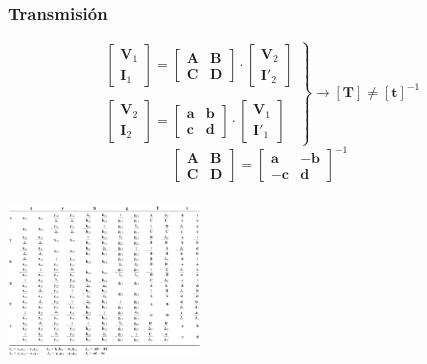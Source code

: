 \subsubsection{Transmisión}
\label{sec:org47212d8}
\[
  \left.
    \begin{array}{l}
  \left[
    \begin{array}{c}
      \mathbf{V}_1\\
      \mathbf{I}_1
    \end{array}
  \right] =
  \left[
    \begin{array}{cc}
      \mathbf{A} & \mathbf{B}\\
      \mathbf{C} & \mathbf{D}
    \end{array}
  \right] \cdot
  \left[
    \begin{array}{c}
      \mathbf{V}_2\\
      \mathbf{I'}_2
    \end{array}
  \right]
      \\ \\
  \left[
    \begin{array}{c}
      \mathbf{V}_2\\
      \mathbf{I}_2
    \end{array}
  \right] =
  \left[
    \begin{array}{cc}
      \mathbf{a} & \mathbf{b}\\
      \mathbf{c} & \mathbf{d}
    \end{array}
  \right] \cdot
  \left[
    \begin{array}{c}
      \mathbf{V}_1\\
      \mathbf{I'}_1
    \end{array}
  \right]
      \end{array}
    \right\}
    \rightarrow
    \boxed{[\mathbf{T}] \neq [\mathbf{t}]^{-1}}
  \]
\[
  \boxed{
    \left[
      \begin{array}{cc}
        \mathbf{A} & \mathbf{B}\\
        \mathbf{C} & \mathbf{D}
      \end{array}\right] = 
      \left[
      \begin{array}{cc}
        \mathbf{a} & \mathbf{-b}\\
        \mathbf{-c} & \mathbf{d}
      \end{array}
      \right]^{-1}
    }
\]
\subsubsection{}
\label{sec:orgf3da70f}
\begin{center}
\includegraphics[height=4cm]{../figs/Tabla_Parametros.pdf}
\end{center}

